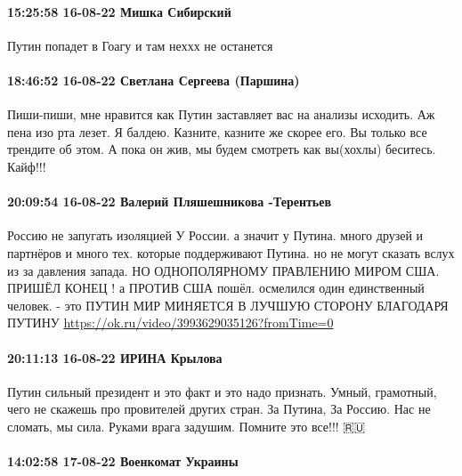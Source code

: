  
 
 
 
 

\paragraph{15:25:58 16-08-22 Мишка Сибирский}

Путин попадет в Гоагу и там неххх не останется

\paragraph{18:46:52 16-08-22 Светлана Сергеева (Паршина)}

Пиши-пиши, мне нравится как Путин заставляет вас на анализы исходить. Аж пена
изо рта лезет. Я балдею. Казните, казните же скорее его. Вы только все трендите
об этом. А пока он жив, мы будем смотреть как вы(хохлы) беситесь. Кайф!!!

\paragraph{20:09:54 16-08-22 Валерий Пляшешникова -Терентьев}

Россию не запугать изоляцией У России. а значит у Путина. много друзей и
партнёров и много тех. которые поддерживают Путина. но не могут сказать вслух
из за давления запада. НО ОДНОПОЛЯРНОМУ ПРАВЛЕНИЮ МИРОМ США. ПРИШЁЛ КОНЕЦ ! а
ПРОТИВ США пошёл. осмелился один единственный человек. - это ПУТИН МИР МИНЯЕТСЯ
В ЛУЧШУЮ СТОРОНУ БЛАГОДАРЯ ПУТИНУ \url{https://ok.ru/video/3993629035126?fromTime=0}

\paragraph{20:11:13 16-08-22 ИРИНА Крылова}

Путин сильный президент и это факт и это надо признать. Умный, грамотный, чего
не скажешь про провителей других стран. За Путина, За Россию. Нас не сломать,
мы сила. Руками врага задушим. Помните это все!!! 🇷🇺🤛

\paragraph{14:02:58 17-08-22 Военкомат Украины}

